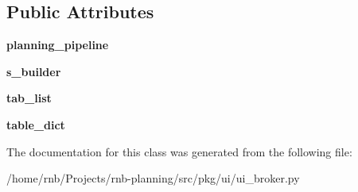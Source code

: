 \subsection*{Public Attributes}
\begin{DoxyCompactItemize}
\item 
\mbox{\label{classrnb-planning_1_1src_1_1pkg_1_1ui_1_1ui__broker_1_1_u_i_broker_ac5729c12bd49a0b7b371ad75fb11c668}} 
{\bfseries planning\+\_\+pipeline}
\item 
\mbox{\label{classrnb-planning_1_1src_1_1pkg_1_1ui_1_1ui__broker_1_1_u_i_broker_ac75ed899c8dc4832b975cde7c836699b}} 
{\bfseries s\+\_\+builder}
\item 
\mbox{\label{classrnb-planning_1_1src_1_1pkg_1_1ui_1_1ui__broker_1_1_u_i_broker_a3edfe969fe4c6b81c5e81494509ea43e}} 
{\bfseries tab\+\_\+list}
\item 
\mbox{\label{classrnb-planning_1_1src_1_1pkg_1_1ui_1_1ui__broker_1_1_u_i_broker_acb809cb8de94d1765a98c46cc3c70dcf}} 
{\bfseries table\+\_\+dict}
\end{DoxyCompactItemize}


The documentation for this class was generated from the following file\+:\begin{DoxyCompactItemize}
\item 
/home/rnb/\+Projects/rnb-\/planning/src/pkg/ui/ui\+\_\+broker.\+py\end{DoxyCompactItemize}
